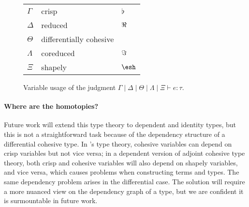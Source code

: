 \documentclass{article}
\begin{document}




\begin{wrapfigure}{L}{0.31\textwidth}
\begin{center} \begin{tabular}{lll}
    $\Gamma$ & crisp  &  $\flat$ \\
    $\Delta$ & reduced & $\Re$ \\
    $\Theta$ & differentially cohesive & \\
    $\Lambda$ & coreduced & $\Im$ \\
    $\Xi$ & shapely & $\shape$
\end{tabular} \end{center}
\caption{Variable usage of the judgment
  $\Gamma \mid \Delta \mid \Theta \mid \Lambda \mid \Xi \vdash e : \tau$.}
\label{fig:contexts}
\end{wrapfigure}

\paragraph{Where are the homotopies?}
Future work will extend this type theory to dependent and identity types, but
this is not a straightforward task because of the dependency structure of a
differential cohesive type. In \citet{Shulman2015}'s type theory, cohesive
variables can depend on crisp variables but not vice versa; in a dependent
version of adjoint cohesive type theory, both crisp and cohesive variables will
also depend on shapely variables, and vice versa, which causes problems when
constructing terms and types. The same dependency problem
arises in the differential case. The solution will require a
more nuanced view on the dependency graph of a type, but we are confident it is
surmountable in future work.



\end{document}

